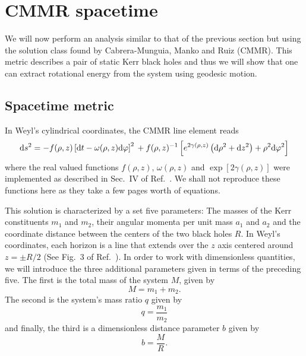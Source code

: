 \section{CMMR spacetime}

We will now perform an analysis similar to that of the previous section but using the solution class found by Cabrera-Munguia, Manko and Ruiz (CMMR). This metric describes a pair of static Kerr black holes and thus we will show that one can extract rotational energy from the system using geodesic motion.

\subsection{Spacetime metric}

In Weyl's cylindrical coordinates, the CMMR line element reads
%
\begin{equation}
  \mathrm{d} s^2 = -f(\rho,z)\left[\mathrm{d} t - \omega(\rho,z)\mathrm{d}\varphi\right]^2 \\
  + f(\rho,z)^{-1}\left[e^{2\gamma(\rho,z)}\left(\mathrm{d} \rho^2 + \mathrm{d} z^2\right) + \rho^2\mathrm{d}\varphi^2\right]
  \label{ch:penrose_binaries/eq:line_element}
\end{equation}
%
where the real valued functions $f(\rho,z)$, $\omega(\rho,z)$ and $\exp[2\gamma(\rho,z)]$ were implemented as described in Sec.~IV of Ref.~\cite{MANKO2020}. We shall not reproduce these functions here as they take a few pages worth of equations.

This solution is characterized by a set five parameters: The masses of the Kerr constituents $m_1$ and $m_2$, their angular momenta per unit mass $a_1$ and $a_2$ and the coordinate distance between the centers of the two black holes $R$. In Weyl's coordinates, each horizon is a line that extends over the $z$ axis centered around $z=\pm R/2$ (See Fig.~3 of Ref.~\cite{MANKO2020}). In order to work with dimensionless quantities, we will introduce the three additional parameters given in terms of the preceding five. The first is the total mass of the system $M$, given by
%
\begin{equation}
  M = m_1 + m_2.
  \label{ch:penrose_binaries/eq:total_mass_def}
\end{equation}
%
The second is the system's mass ratio $q$ given by
%
\begin{equation}
  q = \frac{m_1}{m_2}
  \label{ch:penrose_binaries/eq:mass_ratio_def}
\end{equation}
%
and finally, the third is a dimensionless distance parameter $b$ given by
%
\begin{equation}
  b = \frac{M}{R}.
  \label{ch:penrose_binaries/eq:dist_param_def}
\end{equation}


